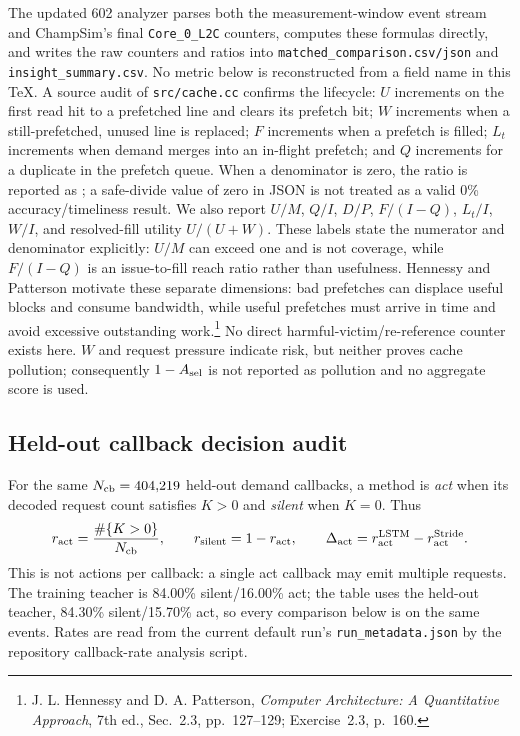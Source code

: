\documentclass[10pt]{article}
\newcommand{\NA}{\textemdash}
\begin{document}
\begin{infobox}[title={\bfseries Exact interpretation boundaries}]
The updated 602 analyzer parses both the measurement-window event stream and
ChampSim's final \texttt{Core\_0\_L2C} counters, computes these formulas
directly, and writes the raw counters and ratios into
\texttt{matched\_comparison.csv/json} and \texttt{insight\_summary.csv}.
No metric below is reconstructed from a field name in this TeX.  A source
audit of \texttt{src/cache.cc} confirms the lifecycle: $U$ increments on the first read
hit to a prefetched line and clears its prefetch bit; $W$ increments when a
still-prefetched, unused line is replaced; $F$ increments when a prefetch is
filled; $L_t$ increments when demand merges into an in-flight prefetch; and
$Q$ increments for a duplicate in the prefetch queue.  When a denominator is
zero, the ratio is reported as \NA; a safe-divide value of zero in JSON is not
treated as a valid 0\% accuracy/timeliness result.  We also report
$U/M$, $Q/I$, $D/P$, $F/(I-Q)$, $L_t/I$, $W/I$, and resolved-fill
utility $U/(U+W)$.  These labels state the numerator and denominator
explicitly: $U/M$ can exceed one and is not coverage, while $F/(I-Q)$ is an
issue-to-fill reach ratio rather than usefulness.
Hennessy and Patterson motivate these separate dimensions: bad prefetches can
displace useful blocks and consume bandwidth, while useful prefetches must
arrive in time and avoid excessive outstanding work.\footnote{J. L. Hennessy
and D. A. Patterson, \emph{Computer Architecture: A Quantitative Approach},
7th ed., Sec.~2.3, pp.~127--129; Exercise~2.3, p.~160.}
No direct harmful-victim/re-reference counter exists here.  $W$ and request
pressure indicate risk, but neither proves cache pollution; consequently
$1-A_{\rm sel}$ is not reported as pollution and no aggregate score is used.
\end{infobox}

\subsection*{Held-out callback decision audit}
\begin{infobox}[title={\bfseries Silent versus act is a callback metric}]
For the same $N_{\rm cb}=404{,}219$ held-out demand callbacks, a method is
\emph{act} when its decoded request count satisfies $K>0$ and \emph{silent}
when $K=0$.  Thus
\[
 r_{\rm act}=\frac{\#\{K>0\}}{N_{\rm cb}},\qquad
 r_{\rm silent}=1-r_{\rm act},\qquad
 \Delta_{\rm act}=r_{\rm act}^{\rm LSTM}-r_{\rm act}^{\rm Stride}.
\]
This is not actions per callback: a single act callback may emit multiple
requests.  The training teacher is 84.00\% silent/16.00\% act; the table uses
the held-out teacher, 84.30\% silent/15.70\% act, so every comparison below is
on the same events.  Rates are read from the current default run's
\texttt{run\_metadata.json} by the repository callback-rate analysis script.
\end{infobox}
\end{document}
